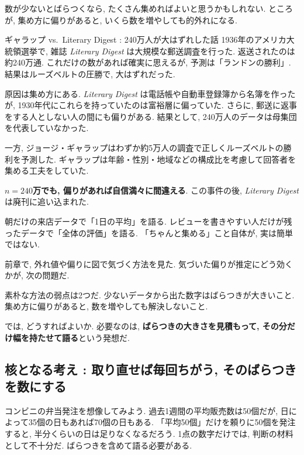     数が少ないとばらつくなら, たくさん集めればよいと思うかもしれない.
    ところが, 集め方に偏りがあると, いくら数を増やしても的外れになる.

    \begin{mybox}{ギャラップ vs.\ Literary Digest : 240万人が大はずれした話}
    1936年のアメリカ大統領選挙で, 雑誌 \textit{Literary Digest} は大規模な郵送調査を行った.
    返送されたのは約240万通.
    これだけの数があれば確実に思えるが, 予測は「ランドンの勝利」.
    結果はルーズベルトの圧勝で, 大はずれだった.

    原因は集め方にある.
    \textit{Literary Digest} は電話帳や自動車登録簿から名簿を作ったが, 1930年代にこれらを持っていたのは富裕層に偏っていた.
    さらに, 郵送に返事をする人としない人の間にも偏りがある.
    結果として, 240万人のデータは母集団を代表していなかった.

    一方, ジョージ・ギャラップはわずか約5万人の調査で正しくルーズベルトの勝利を予測した.
    ギャラップは年齢・性別・地域などの構成比を考慮して回答者を集める工夫をしていた.

    \textbf{$n=240$万でも, 偏りがあれば自信満々に間違える}.
    この事件の後, \textit{Literary Digest} は廃刊に追い込まれた.
    \end{mybox}

    朝だけの来店データで「1日の平均」を語る.
    レビューを書きやすい人だけが残ったデータで「全体の評価」を語る.
    「ちゃんと集める」こと自体が, 実は簡単ではない.

    前章で, 外れ値や偏りに図で気づく方法を見た.
    気づいた偏りが推定にどう効くかが, 次の問題だ.

    素朴な方法の弱点は2つだ.
    少ないデータから出た数字はばらつきが大きいこと.
    集め方に偏りがあると, 数を増やしても解決しないこと.

    では, どうすればよいか.
    必要なのは, \textbf{ばらつきの大きさを見積もって, その分だけ幅を持たせて語る}という発想だ.


  \subsection{核となる考え : 取り直せば毎回ちがう, そのばらつきを数にする}

    コンビニの弁当発注を想像してみよう.
    過去1週間の平均販売数は50個だが, 日によって35個の日もあれば70個の日もある.
    「平均50個」だけを頼りに50個を発注すると, 半分くらいの日は足りなくなるだろう.
    1点の数字だけでは, 判断の材料として不十分だ.
    ばらつきを含めて語る必要がある.

